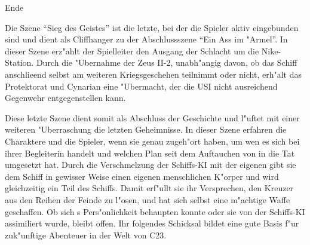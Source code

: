 \begin{remarks}
	\begin{center}\huge{}Ende\end{center}

	Die Szene "`Sieg des Geistes"' ist die letzte, bei der die Spieler aktiv eingebunden sind und dient als Cliffhanger zu der Abschlussszene "`Ein Ass im "Armel"'. In dieser Szene erz"ahlt der Spielleiter den Ausgang der Schlacht um die Nike-Station. Durch die "Ubernahme der Zeus II-2, unabh"angig davon, ob das Schiff anschlie\3end selbst am weiteren Kriegsgeschehen teilnimmt oder nicht, erh"alt das Protektorat und Cynarian eine "Ubermacht, der die USI nicht ausreichend Gegenwehr entgegenstellen kann.

	Diese letzte Szene dient somit als Abschluss der Geschichte und l"uftet mit einer weiteren "Uberraschung die letzten Geheimnisse. In dieser Szene erfahren die Charaktere und die Spieler, wenn sie genau zugeh"ort haben, um wen es sich bei ihrer Begleiterin handelt und welchen Plan \xl{} seit dem Auftauchen von \ml{} in die Tat umgesetzt hat. Durch die Verschmelzung der Schiffs-KI mit der eigenen gibt sie dem Schiff in gewisser Weise einen eigenen menschlichen K"orper und wird gleichzeitig ein Teil des Schiffs. Damit erf"ullt sie ihr Versprechen, den Kreuzer aus den Reihen der Feinde zu l"osen, und hat sich selbst eine m"achtige Waffe geschaffen. Ob sich \xl{}s Pers"onlichkeit behaupten konnte oder sie von der Schiffs-KI assimiliert wurde, bleibt offen. Ihr folgendes Schicksal bildet eine gute Basis f"ur zuk"unftige Abenteuer in der Welt von C23.
\end{remarks}
\vfill\pagebreak
